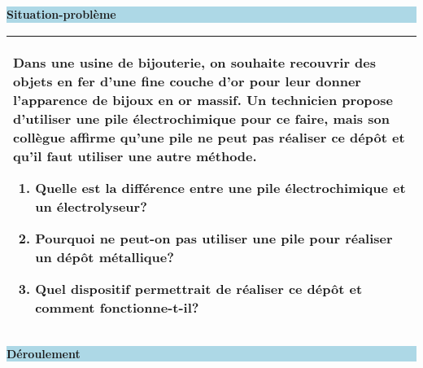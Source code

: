 \documentclass[12pt]{article}
\begin{document}
\begin{center}
\colorbox{lightblue}{\parbox{15cm}{\centering\textbf{Situation-problème}}}
\end{center}

\begin{tabular}{|p{16cm}|}
\hline

Dans une usine de bijouterie, on souhaite recouvrir des objets en fer d'une fine couche d'or pour leur donner l'apparence de bijoux en or massif. Un technicien propose d'utiliser une pile électrochimique pour ce faire, mais son collègue affirme qu'une pile ne peut pas réaliser ce dépôt et qu'il faut utiliser une autre méthode.


\begin{enumerate}
  \item  Quelle est la différence entre une pile électrochimique et un électrolyseur?
  \item Pourquoi ne peut-on pas utiliser une pile pour réaliser un dépôt métallique?
  \item Quel dispositif permettrait de réaliser ce dépôt et comment fonctionne-t-il?
\end{enumerate} \\
\hline
\end{tabular}

\vspace{1cm}

\begin{center}
\colorbox{lightblue}{\parbox{15cm}{\centering\textbf{Déroulement}}}
\end{center}
\end{document}
